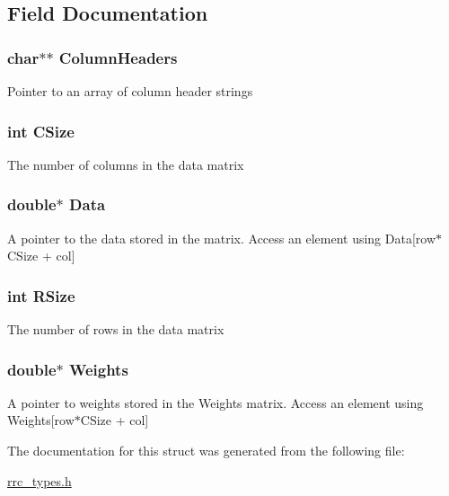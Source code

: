 \subsection{Field Documentation}
\hypertarget{struct_r_r_c_data_ab339159e5604808f92fe793f4f43da03}{
\subsubsection[{Column\-Headers}]{\setlength{\rightskip}{0pt plus 5cm}char$\ast$$\ast$ Column\-Headers}}\label{struct_r_r_c_data_ab339159e5604808f92fe793f4f43da03}
Pointer to an array of column header strings \hypertarget{struct_r_r_c_data_a17c9a5894aa9cb3789346dcaa9c370bb}{
\subsubsection[{C\-Size}]{\setlength{\rightskip}{0pt plus 5cm}int C\-Size}}\label{struct_r_r_c_data_a17c9a5894aa9cb3789346dcaa9c370bb}
The number of columns in the data matrix \hypertarget{struct_r_r_c_data_a7c5cbda3aa940f4b0d6e8a1679307dfc}{
\subsubsection[{Data}]{\setlength{\rightskip}{0pt plus 5cm}double$\ast$ Data}}\label{struct_r_r_c_data_a7c5cbda3aa940f4b0d6e8a1679307dfc}
A pointer to the data stored in the matrix. Access an element using Data\mbox{[}row$\ast$\-C\-Size + col\mbox{]} \hypertarget{struct_r_r_c_data_a4d8512c879223c0e0d1522dae38e7819}{
\subsubsection[{R\-Size}]{\setlength{\rightskip}{0pt plus 5cm}int R\-Size}}\label{struct_r_r_c_data_a4d8512c879223c0e0d1522dae38e7819}
The number of rows in the data matrix \hypertarget{struct_r_r_c_data_a557faafe2bb582e0c88078603aacb1c7}{
\subsubsection[{Weights}]{\setlength{\rightskip}{0pt plus 5cm}double$\ast$ Weights}}\label{struct_r_r_c_data_a557faafe2bb582e0c88078603aacb1c7}
A pointer to weights stored in the Weights matrix. Access an element using Weights\mbox{[}row$\ast$\-C\-Size + col\mbox{]} 

The documentation for this struct was generated from the following file\-:\begin{DoxyCompactItemize}
\item 
\hyperlink{rrc__types_8h}{rrc\-\_\-types.\-h}\end{DoxyCompactItemize}
